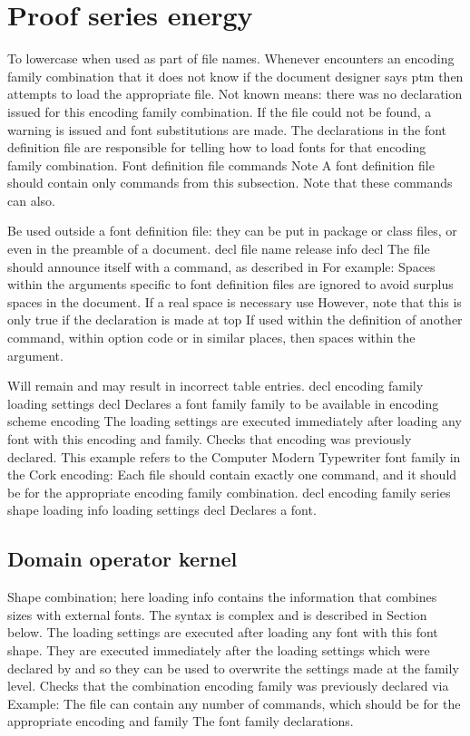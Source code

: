 \documentclass{article}
\begin{document}
\section{Proof series energy}\label{sec17}
To lowercase when used as part of file names. Whenever encounters an encoding family combination that it does not know if the document designer says ptm then attempts to load the appropriate file. Not known means: there was no declaration issued for this encoding family combination. If the file could not be found, a warning is issued and font substitutions are made. The declarations in the font definition file are responsible for telling how to load fonts for that encoding family combination. Font definition file commands Note A font definition file should contain only commands from this subsection. Note that these commands can also.

Be used outside a font definition file: they can be put in package or class files, or even in the preamble of a document. decl file name release info decl The file should announce itself with a command, as described in For example: Spaces within the arguments specific to font definition files are ignored to avoid surplus spaces in the document. If a real space is necessary use However, note that this is only true if the declaration is made at top If used within the definition of another command, within option code or in similar places, then spaces within the argument.

Will remain and may result in incorrect table entries. decl encoding family loading settings decl Declares a font family family to be available in encoding scheme encoding The loading settings are executed immediately after loading any font with this encoding and family. Checks that encoding was previously declared. This example refers to the Computer Modern Typewriter font family in the Cork encoding: Each file should contain exactly one command, and it should be for the appropriate encoding family combination. decl encoding family series shape loading info loading settings decl Declares a font.

\subsection{Domain operator kernel}
Shape combination; here loading info contains the information that combines sizes with external fonts. The syntax is complex and is described in Section below. The loading settings are executed after loading any font with this font shape. They are executed immediately after the loading settings which were declared by and so they can be used to overwrite the settings made at the family level. Checks that the combination encoding family was previously declared via Example: The file can contain any number of commands, which should be for the appropriate encoding and family The font family declarations.
\end{document}
